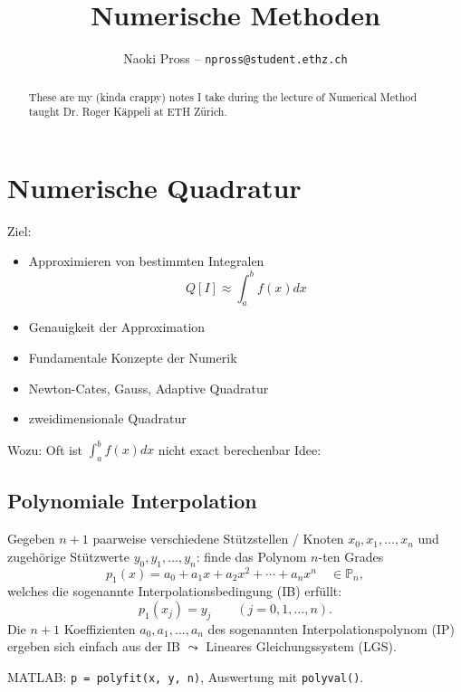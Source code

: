 \documentclass[a4paper]{article}
\title{Numerische Methoden}
\author{Naoki Pross -- \texttt{npross@student.ethz.ch}}
\newcommand*{\code}[1]{\texttt{#1}}
\begin{document}
\maketitle

\begin{abstract}
  These are my (kinda crappy) notes I take during the lecture of Numerical
  Method taught Dr. Roger Käppeli at ETH Zürich.
\end{abstract}

\section{Numerische Quadratur}

Ziel:

\begin{itemize}
	\item Approximieren von bestimmten Integralen
    \[
      Q[I] \approx \int_a^b f(x) dx
    \]
  \item  Genauigkeit der Approximation
  \item Fundamentale Konzepte der Numerik
  \item Newton-Cates, Gauss, Adaptive Quadratur
  \item zweidimensionale Quadratur
\end{itemize}

Wozu: Oft ist $\int_a^b f(x) dx$ nicht exact berechenbar 
Idee:

\begin{center}
  \skelfig
\end{center}

\subsection{Polynomiale Interpolation}

Gegeben $n+1$ paarweise verschiedene Stützstellen / Knoten $x_0, x_1, \ldots,
x_n$ und zugehörige Stützwerte $y_0, y_1, \ldots, y_n$: finde das Polynom
$n$-ten Grades
\[
  p_1(x) = a_0 + a_1 x + a_2 x^2 + \cdots + a_n x^n \quad \in \mathbb{P}_n,
\]
welches die sogenannte Interpolationsbedingung (IB) erfüllt:
\[
  p_1(x_j) = y_j \qquad (j = 0,1,\ldots,n).
\]
Die $n+1$ Koeffizienten $a_0, a_1, \ldots, a_n$ des sogenannten
Interpolationspolynom (IP) ergeben sich einfach aus der IB $\leadsto$ Lineares
Gleichungssystem (LGS).
\begin{center}
  \skelfig
\end{center}
MATLAB: \code{p = polyfit(x, y, n)}, Auswertung mit \code{polyval()}.
\end{document}
